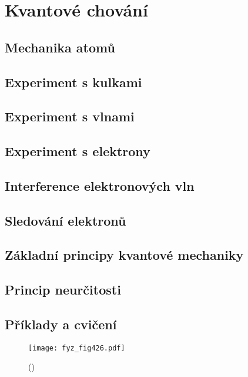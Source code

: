 {
\chapter{Kvantové chování}\label{fyz:IchapXXXVII}
\minitoc
\section{Mechanika atomů}\label{fyz:IchapXXXVIIsecI}
\section{Experiment s kulkami}\label{fyz:IchapXXXVIIsecII}
\section{Experiment s vlnami}\label{fyz:IchapXXXVIIsecIII}
\section{Experiment s elektrony}\label{fyz:IchapXXXVIIsecIV}
\section{Interference elektronových vln}\label{fyz:IchapXXXVIIsecV}
\section{Sledování elektronů}\label{fyz:IchapXXXVIIsecVI}
\section{Základní principy kvantové mechaniky}\label{fyz:IchapXXXVIIsecVII}
\section{Princip neurčitosti}\label{fyz:IchapXXXVIIsecVIII}
\section{Příklady a cvičení}\label{fyz:IchapXXXVIIsecIX}

  \begin{figure}[ht!] %
    \centering
    \texttt{[image: fyz\_fig426.pdf]}
    \caption{
             (\cite[s.~697]{Feynman01})}
    \label{fyz:fig426}
  \end{figure}

}
